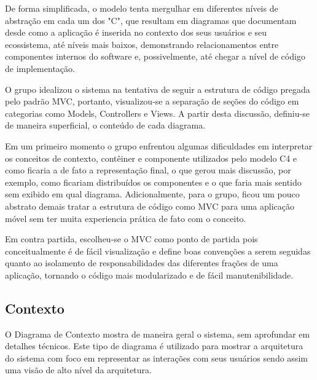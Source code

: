\documentclass[12pt]{article}
\begin{document}
De forma simplificada, o modelo tenta mergulhar em diferentes níveis de abstração em cada um dos "C", que resultam em diagramas que documentam desde como a aplicação é inserida no contexto dos seus usuários e seu ecossistema, até níveis mais baixos, demonstrando relacionamentos entre componentes internos do software e, possivelmente, até chegar a nível de código de implementação.

O grupo idealizou o sistema na tentativa de seguir a estrutura de código pregada pelo padrão MVC, portanto, visualizou-se a separação de seções do código em categorias como Models, Controllers e Views.
A partir desta discussão, definiu-se de maneira superficial, o conteúdo de cada diagrama.

Em um primeiro momento o grupo enfrentou algumas dificuldades em interpretar os conceitos de contexto, contêiner e componente utilizados pelo modelo C4 e como ficaria a de fato a representação final, o que gerou mais discussão, por exemplo, como ficariam distribuídos os componentes e o que faria mais sentido sem exibido em qual diagrama. Adicionalmente, para o grupo, ficou um pouco abstrato demais tratar a estrutura de código como MVC para uma aplicação móvel sem ter muita experiencia prática de fato com o conceito.

Em contra partida, escolheu-se o MVC como ponto de partida pois conceitualmente é de fácil visualização e define boas convenções a serem seguidas quanto ao isolamento de responsabilidades das diferentes frações de uma aplicação, tornando o código mais modularizado e de fácil manutenibilidade.




\subsection{Contexto}
O Diagrama de Contexto mostra de maneira geral o sistema, sem aprofundar em detalhes técnicos. Este tipo de diagrama é utilizado para mostrar a arquitetura do sistema com foco em representar as interações com seus usuários sendo assim uma visão de alto nível da arquitetura.
\end{document}
